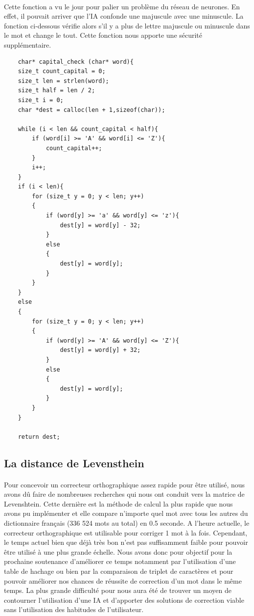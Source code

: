 \documentclass{article}
\begin{document}
\paragraph{}Cette fonction a vu le jour pour palier un problème du réseau de neurones. En effet, il pouvait arriver que l'IA confonde une majuscule avec une minuscule. La fonction ci-dessous vérifie alors s’il y a plus de lettre majuscule ou minuscule dans le mot et change le tout.  Cette fonction nous apporte une sécurité supplémentaire.

\begin{lstlisting}
	char* capital_check (char* word){
    size_t count_capital = 0;
    size_t len = strlen(word);
    size_t half = len / 2;
    size_t i = 0;
    char *dest = calloc(len + 1,sizeof(char));

    while (i < len && count_capital < half){
        if (word[i] >= 'A' && word[i] <= 'Z'){
            count_capital++;
        }
        i++;
    }
    if (i < len){
        for (size_t y = 0; y < len; y++)
        {
            if (word[y] >= 'a' && word[y] <= 'z'){
                dest[y] = word[y] - 32;
            }
            else
            {
                dest[y] = word[y];
            }
        }
    }
    else
    {
        for (size_t y = 0; y < len; y++)
        {
            if (word[y] >= 'A' && word[y] <= 'Z'){
                dest[y] = word[y] + 32;
            }
            else
            {
                dest[y] = word[y];
            }
        }
    }

    return dest;
\end{lstlisting}

\subsection{La distance de Levensthein}
\paragraph{}Pour concevoir un correcteur orthographique assez rapide pour être utilisé, nous avons dû faire de nombreuses recherches qui nous ont conduit vers la matrice de Levenshtein. Cette dernière est la méthode de calcul la plus rapide que nous avons pu implémenter et elle compare n’importe quel mot avec tous les autres du dictionnaire français (336 524 mots au total) en 0.5 seconde. A l'heure actuelle, le correcteur orthographique est utilisable pour corriger 1 mot à la fois. Cependant, le temps actuel bien que déjà très bon n’est pas suffisamment faible pour pouvoir être utilisé à une plus grande échelle. Nous avons donc pour objectif pour la prochaine soutenance d’améliorer ce temps notamment par l’utilisation d’une table de hachage ou bien par la comparaison de triplet de caractères et pour pouvoir améliorer nos chances de réussite de correction d’un mot dans le même temps. La plus grande difficulté pour nous aura été de trouver un moyen de contourner l'utilisation d'une IA et d’apporter des solutions de correction viable sans l’utilisation des habitudes de l’utilisateur.
\end{document}
